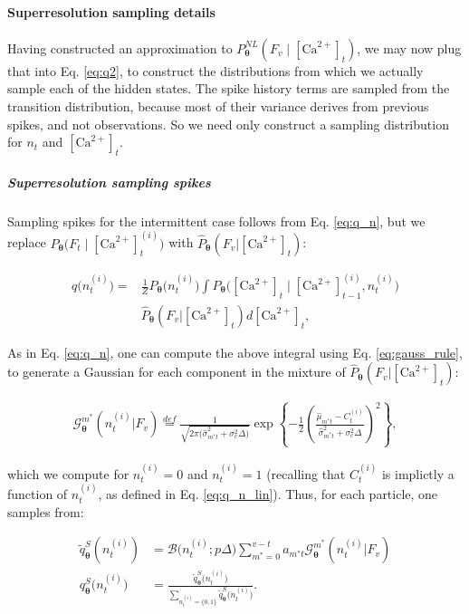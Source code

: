 \documentclass[10pt]{article}
\providecommand{\ve}[1]{\boldsymbol{#1}}
\providecommand{\ve}[1]{\boldsymbol{#1}}
\newcommand{\thetn}{\ve{\theta}}
\newcommand{\p}{P_{\thetn}}
\newcommand{\phat}{\widehat{P}_{\thetn}(F_v | \Ca_t)}
\newcommand{\m}{m^{\ast}}
\newcommand{\Ca}{[\text{Ca}^{2+}]}
\begin{document}
\paragraph{Superresolution sampling details}

Having constructed an approximation to $\p^{NL}(F_v \mid \Ca_t)$, we may now plug that into Eq. \ref{eq:q2}, to construct the distributions from which we actually sample each of the hidden states. The spike history terms are sampled from the transition distribution, because most of their variance derives from previous spikes, and not observations. So we need only construct a sampling distribution for $n_t$ and $\Ca_t$.   

\subparagraph{Superresolution sampling spikes}

Sampling spikes for the intermittent case follows from Eq. \ref{eq:q_n}, but we replace $\p \big(F_t \mid \Ca_t^{(i)} \big)$ with $\phat$:

\begin{align} \label{eq:q_n2}
q\big(n_t^{(i)}\big) =&\frac{1}{Z} \p \big( n_t^{(i)} \big) \int \p \big( \Ca_t \mid \Ca^{(i)}_{t-1}, n_t^{(i)} \big)\nonumber \\& \phat d\Ca_t,
\end{align}

\noindent As in Eq. \ref{eq:q_n}, one can compute the above integral using Eq. \ref{eq:gauss_rule}, to generate a Gaussian for each component in the mixture of $\phat$:

\begin{align} \label{aeq:Z_t}
\mathcal{G}_{\thetn}^{\m}(n_t^{(i)}| F_v) \stackrel{def}{=}
\frac{1}{\sqrt{2 \pi \big(\widehat{\sigma}_{\m t}^2 + \sigma_c^2 \Delta\big)}} \exp \left\{-\frac{1}{2}\left(\frac{\widehat{\mu}_{\m t} - C_t^{(i)}}{ \widehat{\sigma}_{\m t}^2 + \sigma_c^2 \Delta}\right)^2\right\},
\end{align}

\noindent which we compute for $n_t^{(i)}=0$ and $n_t^{(i)}=1$ (recalling that $C_t^{(i)}$ is implictly a function of $n_t^{(i)}$, as defined in Eq. \ref{eq:q_n_lin}).  Thus, for each particle, one samples from:

\begin{subequations} \label{aeq:qn}
\begin{align}
\widetilde{q}_{\thetn}^S(n_t^{(i)})&=\mathcal{B}\big(n_t^{(i)}; p \Delta\big) \sum_{\m=0}^{v-t} a_{\m t} \mathcal{G}_{\thetn}^{\m}(n_t^{(i)}| F_v)\\ 
q_{\thetn}^{S}\big(n_t^{(i)}\big)&=\frac{\widetilde{q}_{\thetn}^S\big(n_t^{(i)}\big)}{\sum_{n_t^{(i)}=\{0,1\}} \widetilde{q}_{\thetn}^S\big(n_t^{(i)}\big)}.
\end{align}
\end{subequations}
\end{document}
